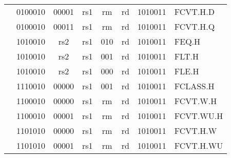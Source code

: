 \begin{table}[p]
\begin{small}
\begin{center}
\begin{tabular}{p{0in}p{0.4in}p{0.05in}p{0.05in}p{0.05in}p{0.05in}p{0.4in}p{0.6in}p{0.4in}p{0.6in}p{0.7in}l}
&
\multicolumn{4}{|c|}{0100010} &
\multicolumn{2}{c|}{00001} &
\multicolumn{1}{c|}{rs1} &
\multicolumn{1}{c|}{rm} &
\multicolumn{1}{c|}{rd} &
\multicolumn{1}{c|}{1010011} & FCVT.H.D \\
\cline{2-11}


&
\multicolumn{4}{|c|}{0100010} &
\multicolumn{2}{c|}{00011} &
\multicolumn{1}{c|}{rs1} &
\multicolumn{1}{c|}{rm} &
\multicolumn{1}{c|}{rd} &
\multicolumn{1}{c|}{1010011} & FCVT.H.Q \\
\cline{2-11}


&
\multicolumn{4}{|c|}{1010010} &
\multicolumn{2}{c|}{rs2} &
\multicolumn{1}{c|}{rs1} &
\multicolumn{1}{c|}{010} &
\multicolumn{1}{c|}{rd} &
\multicolumn{1}{c|}{1010011} & FEQ.H \\
\cline{2-11}


&
\multicolumn{4}{|c|}{1010010} &
\multicolumn{2}{c|}{rs2} &
\multicolumn{1}{c|}{rs1} &
\multicolumn{1}{c|}{001} &
\multicolumn{1}{c|}{rd} &
\multicolumn{1}{c|}{1010011} & FLT.H \\
\cline{2-11}


&
\multicolumn{4}{|c|}{1010010} &
\multicolumn{2}{c|}{rs2} &
\multicolumn{1}{c|}{rs1} &
\multicolumn{1}{c|}{000} &
\multicolumn{1}{c|}{rd} &
\multicolumn{1}{c|}{1010011} & FLE.H \\
\cline{2-11}


&
\multicolumn{4}{|c|}{1110010} &
\multicolumn{2}{c|}{00000} &
\multicolumn{1}{c|}{rs1} &
\multicolumn{1}{c|}{001} &
\multicolumn{1}{c|}{rd} &
\multicolumn{1}{c|}{1010011} & FCLASS.H \\
\cline{2-11}


&
\multicolumn{4}{|c|}{1100010} &
\multicolumn{2}{c|}{00000} &
\multicolumn{1}{c|}{rs1} &
\multicolumn{1}{c|}{rm} &
\multicolumn{1}{c|}{rd} &
\multicolumn{1}{c|}{1010011} & FCVT.W.H \\
\cline{2-11}


&
\multicolumn{4}{|c|}{1100010} &
\multicolumn{2}{c|}{00001} &
\multicolumn{1}{c|}{rs1} &
\multicolumn{1}{c|}{rm} &
\multicolumn{1}{c|}{rd} &
\multicolumn{1}{c|}{1010011} & FCVT.WU.H \\
\cline{2-11}


&
\multicolumn{4}{|c|}{1101010} &
\multicolumn{2}{c|}{00000} &
\multicolumn{1}{c|}{rs1} &
\multicolumn{1}{c|}{rm} &
\multicolumn{1}{c|}{rd} &
\multicolumn{1}{c|}{1010011} & FCVT.H.W \\
\cline{2-11}


&
\multicolumn{4}{|c|}{1101010} &
\multicolumn{2}{c|}{00001} &
\multicolumn{1}{c|}{rs1} &
\multicolumn{1}{c|}{rm} &
\multicolumn{1}{c|}{rd} &
\multicolumn{1}{c|}{1010011} & FCVT.H.WU \\
\cline{2-11}



\end{tabular}
\end{center}
\end{small}
\end{table}
